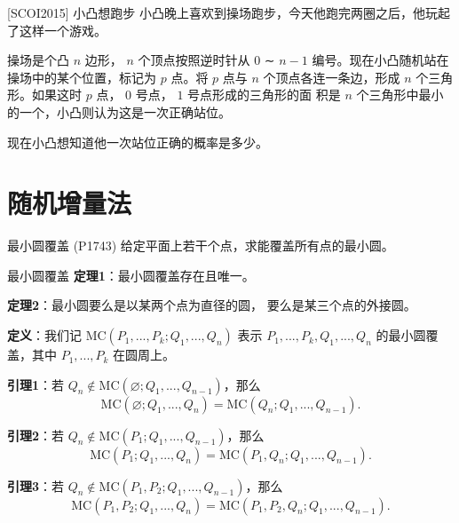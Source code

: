 \documentclass{beamer}
\begin{document}
\begin{frame}{[SCOI2015] 小凸想跑步}
    \small
    小凸晚上喜欢到操场跑步，今天他跑完两圈之后，他玩起了这样一个游戏。

    操场是个凸 $n$ 边形， $n$ 个顶点按照逆时针从 $0$ ∼ $n - 1$ 编号。现在小凸随机站在操场中的某个位置，标记为 $p$ 点。将 $p$ 点与 $n$ 个顶点各连一条边，形成 $n$ 个三角形。如果这时 $p$ 点， $0$ 号点， $1$ 号点形成的三角形的面
    积是 $n$ 个三角形中最小的一个，小凸则认为这是一次正确站位。
    
    现在小凸想知道他一次站位正确的概率是多少。
\end{frame}

\section{随机增量法}

\begin{frame}{最小圆覆盖 (P1743)}
    给定平面上若干个点，求能覆盖所有点的最小圆。
\end{frame}

\begin{frame}{最小圆覆盖}
    \footnotesize
    \textbf{定理1}：最小圆覆盖存在且唯一。

    \vspace{1em}\pause
    \textbf{定理2}：最小圆要么是以某两个点为直径的圆，
    要么是某三个点的外接圆。

    \vspace{1em}\pause
    \textbf{定义}：我们记 $\text{MC}(P_1,...,P_k;Q_1,...,Q_n)$ 表示
    $P_1,...,P_k,Q_1,...,Q_n$ 的最小圆覆盖，其中 $P_1,...,P_k$ 在圆周上。

    \vspace{1em}\pause
    \textbf{引理1}：若 $Q_n\notin \text{MC}(\varnothing;Q_1,...,Q_{n-1})$，那么
    \begin{equation*}
        \text{MC}(\varnothing;Q_1,...,Q_{n})=\text{MC}(Q_n;Q_1,...,Q_{n-1}).
    \end{equation*}

    \vspace{1em}\pause
    \textbf{引理2}：若 $Q_n\notin \text{MC}(P_1;Q_1,...,Q_{n-1})$，那么
    \begin{equation*}
        \text{MC}(P_1;Q_1,...,Q_{n})=\text{MC}(P_1,Q_n;Q_1,...,Q_{n-1}).
    \end{equation*}

    \vspace{1em}\pause
    \textbf{引理3}：若 $Q_n\notin \text{MC}(P_1,P_2;Q_1,...,Q_{n-1})$，那么
    \begin{equation*}
        \text{MC}(P_1,P_2;Q_1,...,Q_{n})=\text{MC}(P_1,P_2,Q_n;Q_1,...,Q_{n-1}).
    \end{equation*}
\end{frame}
\end{document}
